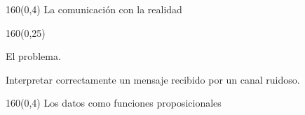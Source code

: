 \documentclass[shownotes,aspectratio=169]{beamer}
\begin{document}
\begin{frame}[plain]
\begin{textblock}{160}(0,4) \centering
\LARGE La comunicación con la realidad
\end{textblock}




\begin{textblock}{160}(0,25) \centering \Large

El problema. \\

\large

Interpretar correctamente un mensaje recibido por un canal ruidoso.
\end{textblock}


\end{frame}


\begin{frame}[plain]
 \begin{textblock}{160}(0,4)
 \centering \LARGE
 Los datos como funciones proposicionales
\end{textblock}
\vspace{0.75cm}

\end{frame}
\end{document}
